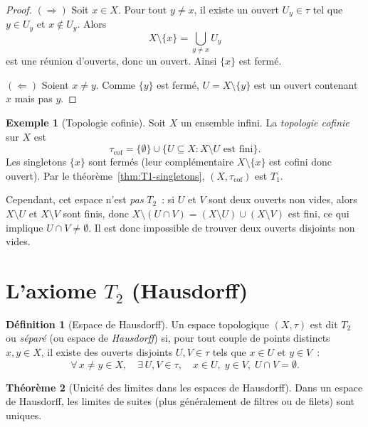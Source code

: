 \documentclass[12pt,a4paper,openany]{book}
\theoremstyle{definition}
\newtheorem{definition}{Définition}[chapter]
\theoremstyle{cours}
\newtheorem{theoreme}{Théorème}[chapter]
\theoremstyle{coursnormal}
\newtheorem{exemple}[theoreme]{Exemple}
\begin{document}
\begin{proof}
  $(\Rightarrow)$ Soit $x\in X$. Pour tout $y\neq x$, il existe un ouvert
  $U_y\in\tau$ tel que $y\in U_y$ et $x\notin U_y$. Alors
  \[
    X\setminus\{x\} = \bigcup_{y\neq x} U_y
  \]
  est une réunion d'ouverts, donc un ouvert. Ainsi $\{x\}$ est fermé.

  \medskip
  $(\Leftarrow)$ Soient $x\neq y$. Comme $\{y\}$ est fermé, $U=X\setminus\{y\}$
  est un ouvert contenant $x$ mais pas $y$.
\end{proof}

\begin{exemple}[Topologie cofinie]\label{ex:cofinie-T1}
  Soit $X$ un ensemble infini. La \emph{topologie
  cofinie} sur $X$ est
  \[
    \tau_{\mathrm{cof}} = \{\emptyset\} \cup \{U\subseteq X : X\setminus U
    \text{ est fini}\}.
  \]
  Les singletons $\{x\}$ sont fermés (leur complémentaire $X\setminus\{x\}$
  est cofini donc ouvert). Par le théorème~\ref{thm:T1-singletons}, $(X,\tau_{\mathrm{cof}})$
  est $T_1$.

  Cependant, cet espace n'est \emph{pas} $T_2$~: si $U$ et $V$ sont deux
  ouverts non vides, alors $X\setminus U$ et $X\setminus V$ sont finis, donc
  $X\setminus(U\cap V) = (X\setminus U)\cup(X\setminus V)$ est fini, ce qui
  implique $U\cap V\neq\emptyset$. Il est donc impossible de trouver deux
  ouverts disjoints non vides.
\end{exemple}

\section{L'axiome $T_2$ (Hausdorff)}\label{sec:T2}

\begin{definition}[Espace de Hausdorff]\label{def:T2}
  Un espace topologique
  $(X,\tau)$ est dit \emph{$T_2$} ou \emph{séparé} (ou espace de
  \emph{Hausdorff}) si, pour tout couple de points distincts $x,y\in X$, il
  existe des ouverts disjoints $U,V\in\tau$ tels que $x\in U$ et $y\in V$~:
  \[
    \forall\, x\neq y\in X,\quad
    \exists\, U,V\in\tau,\quad
    x\in U,\; y\in V,\; U\cap V=\emptyset.
  \]
\end{definition}

\begin{theoreme}[Unicité des limites dans les espaces de Hausdorff]\label{thm:unicite-limites}
  Dans un espace de Hausdorff, les limites de suites
  (plus généralement de filtres ou de filets) sont uniques.
\end{theoreme}
\end{document}
